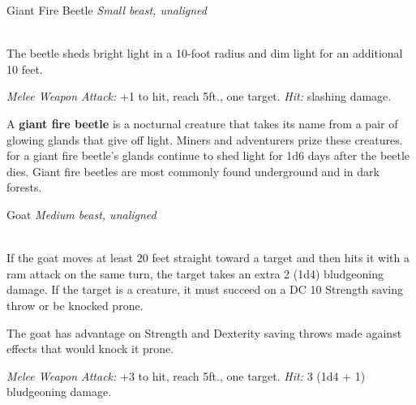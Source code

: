 \documentclass[10pt,twoside,twocolumn,openany]{book}
\begin{document}
\begin{monsterboxnobg}{Giant Fire Beetle}
	\textit{Small beast, unaligned}\\
	\hline
	\basics[
		armorclass	= 13 (natural armor),
		hitpoints 		= \dice{1d6 + 1},
		speed		= {30 ft.}
	]
	\hline
	\stats[
		STR	= \stat{8},
		DEX	= \stat{10},
		CON	= \stat{12},
		INT	= \stat{1},
		WIS	= \stat{7},
		CHA	= \stat{3}
	]
	\hline
	\details[
		skills			= {},
		senses		= {blindsight 30 ft., passive Perception 8},
		languages		= {-},
		challenge		= 0
	]
	\hline \\[1mm]
	\begin{monsteraction}[lllumination]
		The beetle sheds bright light in a 10-foot radius and dim light for an additional 10 feet.
	\end{monsteraction}
	\begin{monsteraction}[Bite]
		\textit{Melee Weapon Attack:} +1 to hit, reach 5ft., one target. \textit{Hit:}  slashing damage.
	\end{monsteraction}
	
	A \textbf{giant fire beetle} is a nocturnal creature that takes its name from a pair of glowing glands that give off light. Miners and adventurers prize these creatures. for a giant fire beetle's glands continue to shed light for 1d6 days after the beetle dies. Giant fire beetles are most commonly found underground and in dark forests.
\end{monsterboxnobg}
\newpage
\begin{monsterboxnobg}{Goat}
	\textit{Medium beast, unaligned}\\
	\hline
	\basics[
		armorclass	= 10,
		hitpoints 		= 4 (1d8),
		speed		= {40 ft.}
	]
	\hline
	\stats[
		STR	= \stat{12},
		DEX	= \stat{10},
		CON	= \stat{11},
		INT	= \stat{2},
		WIS	= \stat{10},
		CHA	= \stat{5}
	]
	\hline
	\details[
		skills			= {},
		senses		= {passive Perception 10},
		languages		= {-},
		challenge		= 0
	]
	\hline \\[1mm]
	\begin{monsteraction}[Charge]
		 If the goat moves at least 20 feet straight toward a target and then hits it with a ram attack on the same turn, the target takes an extra 2 (1d4) bludgeoning damage. If the target is a creature, it must succeed on a DC 10 Strength saving throw or be knocked prone.
	\end{monsteraction}
	
	\begin{monsteraction}
		 The goat has advantage on Strength and Dexterity saving throws made against effects that would knock it prone.
	\end{monsteraction}
	
	\begin{monsteraction}[Ram]
		\textit{Melee Weapon Attack:} +3 to hit, reach 5ft., one target. \textit{Hit:} 3 (1d4 + 1) bludgeoning damage.
	\end{monsteraction}
\end{monsterboxnobg}
\end{document}
